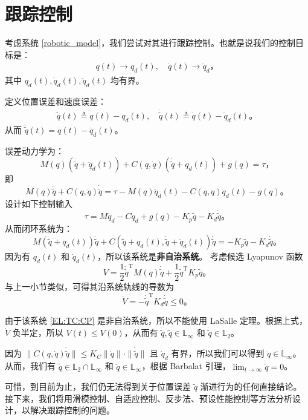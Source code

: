 \section{跟踪控制}\label{6Cref}

考虑系统 \eqref{robotic_model}，我们尝试对其进行跟踪控制。也就是说我们的控制目标是：
\begin{align*}
    q(t) \to q_d(t), \quad \dot{q}(t) \to \dot{q}_d \text{，}
\end{align*}
其中 $q_d(t), \dot{q}_d(t), \ddot{q}_d(t)$ 均有界。

定义位置误差和速度误差：
\begin{align*}
    \tilde{q}(t) \triangleq q(t) - q_d(t), \quad \dot{\tilde{q}}(t) \triangleq \dot{q}(t) - \dot{q}_d(t) \text{。}
\end{align*}
从而 $\ddot{\tilde{q}}(t) = \ddot{q}(t) - \ddot{q}_d(t)$。

误差动力学为：
\[
    M (q) (\ddot{\tilde{q}} + \ddot{q}_d(t)) + C (q, \dot{q}) (\dot{\tilde{q}} + \dot{q}_d(t)) + g(q) = \tau \text{，}
\]
即
\begin{equation}
    M (q) \ddot{\tilde{q}} + C (q, \dot{q}) \dot{\tilde{q}} = \tau - M(q) \ddot{q}_d(t) - C (q, \dot{q}) \dot{q}_d(t) - g(q) \text{。}
\end{equation}
设计如下控制输入
\[
    \tau = M \ddot{q}_d - C \dot{q}_d + g(q) - K_p \tilde{q} - K_d \dot{\tilde{q}} \text{。}
\]
从而闭环系统为：
\begin{equation} \label{EL:TC:CP}
    M (\tilde{q} + q_d (t)) \ddot{\tilde{q}} + C (\tilde{q} + q_d (t),
    \dot{\tilde{q}} + \dot{q}_d (t)) \dot{\tilde{q}} = - K_p \tilde{q} - K_d
    \dot{\tilde{q}} \text{。}
\end{equation}
因为有 $q_d(t)$ 和 $\dot{q}_d(t)$，所以该系统是\textbf{非自治系统}。
考虑候选 Lyapunov 函数
\[
    V = \frac{1}{2} \dot{\tilde{q}}^\mathrm{T} M(q) \dot{\tilde{q}} + \frac{1}{2} \tilde{q}^\mathrm{T} K_p \tilde{q} \text{。}
\]
与上一小节类似，可得其沿系统轨线的导数为
\[
    \dot{V} = - \dot{\tilde{q}}^\mathrm{T} K_d \dot{\tilde{q}} \leq 0 \text{。}
\]

由于该系统 \eqref{EL:TC:CP} 是非自治系统，所以不能使用 LaSalle 定理。根据上式，$\dot{V}$ 负半定，所以 $V(t) \leq V(0)$，从而有 $\dot{\tilde{q}}, \tilde{q} \in \mathbb{L}_\infty$ 和 $\dot{\tilde{q}} \in \mathbb{L}_2$。

因为 $\| C(q, \dot{q}) \dot{\tilde{q}} \| \leq K_C \| \dot{q} \| \cdot \| \dot{\tilde{q}} \|$ 且 $\dot{q}_d$ 有界，所以我们可以得到 $\ddot{q} \in \mathbb{L}_\infty$。从而，我们有 $\dot{\tilde{q}} \in \mathbb{L}_2 \cap \mathbb{L}_\infty$ 和 $\ddot{q} \in \mathbb{L}_\infty$，根据 Barbalat 引理，$\lim_{t \to \infty} \dot{\tilde{q}} = 0$。

可惜，到目前为止，我们仍无法得到关于位置误差 $\tilde{q}$ 渐进行为的任何直接结论。接下来，我们将用滑模控制、自适应控制、反步法、预设性能控制等方法分析设计，以解决跟踪控制的问题。
